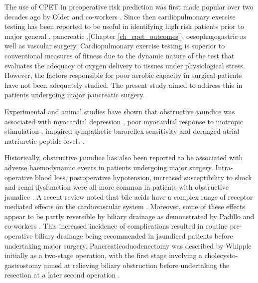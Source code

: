 The use of CPET in preoperative risk prediction was first made popular over two decades ago by Older and co-workers \parencite{older_preoperative_1993}. 
Since then cardiopulmonary exercise testing has been reported to be useful in identifying high risk patients prior to major general \parencite{snowden_submaximal_2010}, pancreatic \parencite{ausania_effects_2012},[Chapter \ref{ch_cpet_outcomes}], oesophagogastric \parencite{nagamatsu_preoperative_2001} as well as vascular \parencite{carlisle_mid-term_2007} surgery. 
Cardiopulmonary exercise testing is superior to conventional measures of fitness due to the dynamic nature of the test that evaluates the adequacy of oxygen delivery to tissues under physiological stress. 
However, the factors responsible for poor aerobic capacity in surgical patients have not been adequately studied. 
The present study aimed to address this in patients undergoing major pancreatic surgery.

Experimental and animal studies have shown that obstructive jaundice was associated with myocardial depression \parencite{green_jaundiced_1986}, poor myocardial response to inotropic stimulation \parencite{lumlertgul_jaundiced_1991}, impaired sympathetic baroreflex sensitivity \parencite{song_baroreflex_2009} and deranged atrial natriuretic peptide levels \parencite{pereira_increased_1994,gallardo_increased_1998}. 

Historically, obstructive jaundice has also been reported to be associated with adverse haemodynamic events in patients undergoing major surgery. 
Intra-operative blood loss, postoperative hypotension, increased susceptibility to shock and renal dysfunction were all more common in patients with obstructive jaundice \parencite{dixon_factors_1983, pain_perioperative_1985, green_systemic_1995}.
A recent review noted that bile acids have a complex range of receptor mediated effects on the cardiovascular system \parencite{khurana_bile_2011}. 
Moreover, some of these effects appear to be partly reversible by biliary drainage as demonstrated by Padillo and co-workers \parencite{padillo_improved_2001}.
This increased incidence of complications resulted in routine pre-operative biliary drainage being recommended in jaundiced patients before undertaking major surgery. 
Pancreaticoduodenectomy was described by Whipple initially as a two-stage operation, with the first stage involving a cholecysto-gastrostomy aimed at relieving biliary obstruction before undertaking the resection at a later second operation \parencite{whipple_treatment_1935}.

